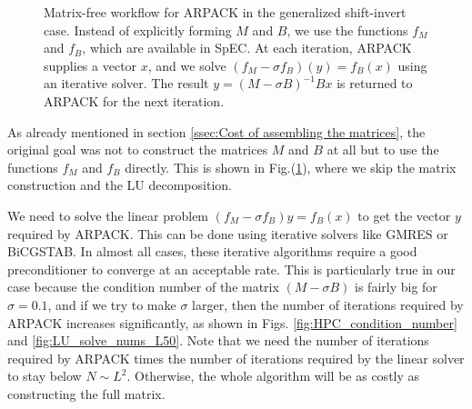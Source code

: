 \documentclass{iopjournal}
\begin{document}
\begin{figure}[h]
\centering
{}
\caption{Matrix-free workflow for ARPACK in the generalized shift-invert case. Instead of explicitly forming $M$ and $B$, we use the functions $f_M$ and $f_B$, which are available in SpEC. At each iteration, ARPACK supplies a vector $x$, and we solve $(f_M - \sigma f_B)(y)=f_B(x)$ using an iterative solver. The result $y = (M-\sigma B)^{-1}Bx$ is returned to ARPACK for the next iteration.}
\label{fig:ARPACK_call_graph_shift_invert_matrix_free}
\end{figure}

As already mentioned in section \ref{ssec:Cost of assembling the matrices}, the original goal was not to construct the matrices $M$ and $B$ at all but to use the functions $f_M$ and $f_B$ directly. This is shown in Fig.(\ref{fig:ARPACK_call_graph_shift_invert_matrix_free}), where we skip the matrix construction and the LU decomposition.

We need to solve the linear problem $(f_M - \sigma f_B)y=f_B(x)$ to get the vector $y$ required by ARPACK. This can be done using iterative solvers like GMRES or BiCGSTAB. In almost all cases, these iterative algorithms require a good preconditioner to converge at an acceptable rate. This is particularly true in our case because the condition number of the matrix $(M - \sigma B)$ is fairly big for $\sigma=0.1$, and if we try to make $\sigma$ larger, then the number of iterations required by ARPACK increases significantly, as shown in Figs. \ref{fig:HPC_condition_number} and \ref{fig:LU_solve_nums_L50}. Note that we need the number of iterations required by ARPACK times the number of iterations required by the linear solver to stay below $N\sim L^2$. Otherwise, the whole algorithm will be as costly as constructing the full matrix.
\end{document}
